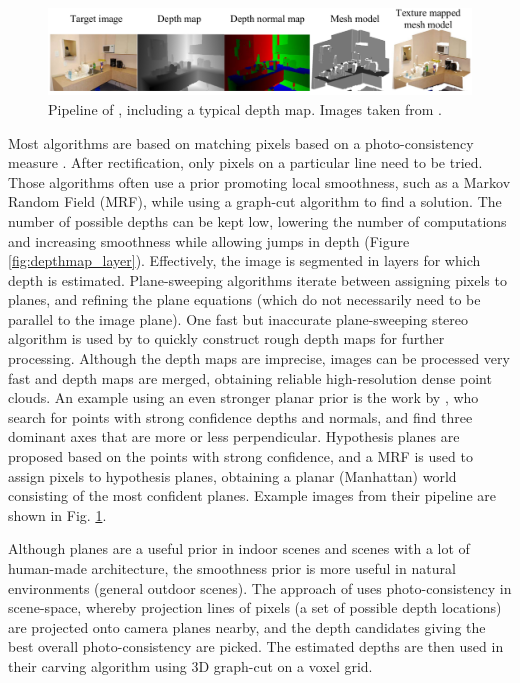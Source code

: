 \begin{figure}[htb!]
 \centering
 \includegraphics[width=1.0\textwidth]{img/depthmap}
 \caption{Pipeline of \FurukawaOld, including a typical depth map. Images taken from \cite{Furukawa2009}.}
 \label{fig:depthmap}
\end{figure}

Most algorithms are based on matching pixels based on a photo-consistency measure \cite{Seitz2006}. After rectification, only pixels on a particular line need to be tried. Those algorithms often use a prior promoting local smoothness, such as a Markov Random Field (MRF), while using a graph-cut algorithm to find a solution. The number of possible depths can be kept low, lowering the number of computations and increasing smoothness while allowing jumps in depth (\eg Figure \ref{fig:depthmap_layer}). Effectively, the image is segmented in layers for which depth is estimated. Plane-sweeping algorithms iterate between assigning pixels to planes, and refining the plane equations (which do not necessarily need to be parallel to the image plane). One fast but inaccurate plane-sweeping stereo algorithm is used by  to quickly construct rough depth maps for further processing. Although the depth maps are imprecise, images can be processed very fast and depth maps are merged, obtaining reliable high-resolution dense point clouds. An example using an even stronger planar prior is the work by \FurukawaOld, who search for points with strong confidence depths and normals, and find three dominant axes that are more or less perpendicular. Hypothesis planes are proposed based on the points with strong confidence, and a MRF is used to assign pixels to hypothesis planes, obtaining a planar (Manhattan) world consisting of the most confident planes. Example images from their pipeline are shown in Fig. \ref{fig:depthmap}.

Although planes are a useful prior in indoor scenes and scenes with a lot of human-made architecture, the smoothness prior is more useful in natural environments (\ie general outdoor scenes). The approach of  uses photo-consistency in scene-space, whereby projection lines of pixels (\ie a set of possible depth locations) are projected onto camera planes nearby, and the depth candidates giving the best overall photo-consistency are picked. The estimated depths are then used in their carving algorithm using 3D graph-cut on a voxel grid.

